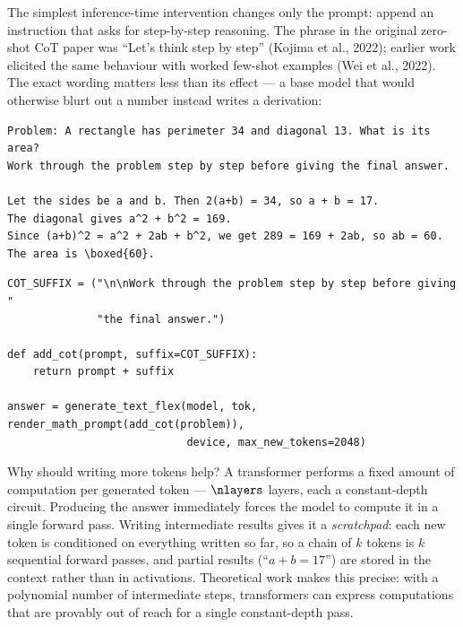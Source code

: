 The simplest inference-time intervention changes only the prompt: append an instruction that asks
for step-by-step reasoning. The phrase in the original zero-shot CoT paper was ``Let's think step
by step'' (Kojima et al., 2022); earlier work elicited the same behaviour with worked few-shot
examples (Wei et al., 2022). The exact wording matters less than its effect --- a base model that
would otherwise blurt out a number instead writes a derivation:

\begin{lstlisting}[style=plain]
Problem: A rectangle has perimeter 34 and diagonal 13. What is its area?
Work through the problem step by step before giving the final answer.

Let the sides be a and b. Then 2(a+b) = 34, so a + b = 17.
The diagonal gives a^2 + b^2 = 169.
Since (a+b)^2 = a^2 + 2ab + b^2, we get 289 = 169 + 2ab, so ab = 60.
The area is \boxed{60}.
\end{lstlisting}

\begin{lstlisting}[caption={Chain-of-thought as a prompt transformation (\texttt{llmsys/tts.py}).},label={lst:scaling:cot}]
COT_SUFFIX = ("\n\nWork through the problem step by step before giving "
              "the final answer.")

def add_cot(prompt, suffix=COT_SUFFIX):
    return prompt + suffix

answer = generate_text_flex(model, tok, render_math_prompt(add_cot(problem)),
                            device, max_new_tokens=2048)
\end{lstlisting}

Why should writing more tokens help? A transformer performs a fixed amount of computation per
generated token --- $\nlayers$ layers, each a constant-depth circuit. Producing the answer
immediately forces the model to compute it in a single forward pass. Writing intermediate results
gives it a \emph{scratchpad}: each new token is conditioned on everything written so far, so a
chain of $k$ tokens is $k$ sequential forward passes, and partial results (``$a+b=17$'') are
stored in the context rather than in activations. Theoretical work makes this precise: with a
polynomial number of intermediate steps, transformers can express computations that are provably
out of reach for a single constant-depth pass.

